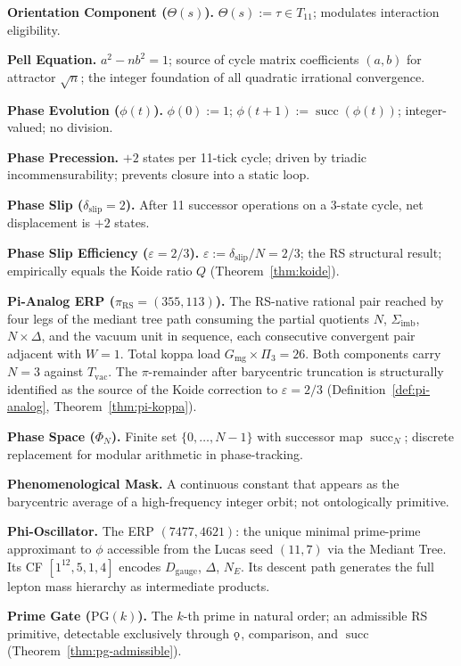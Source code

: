 \documentclass[11pt, letterpaper]{article}
\renewcommand{\succ}{\operatorname{succ}}
\newcommand{\koppa}{\mathbin{\text{\rm\k{o}}}}
\newcommand{\Tcyc}{T_{11}}
\newcommand{\Dg}{D_{\mathrm{gauge}}}
\newcommand{\Sigimb}{\Sigma_{\mathrm{imb}}}
\newcommand{\PG}{\mathrm{PG}}
\newcommand{\Gmg}{G_{\mathrm{mg}}}
\newcommand{\Tvac}{T_{\mathrm{vac}}}
\newcommand{\Pithree}{\Pi_3}
\newcommand{\piRS}{\pi_{\mathrm{RS}}}
\theoremstyle{definition}
\theoremstyle{plain}
\begin{document}
\medskip\noindent\textbf{Orientation Component ($\Theta(s)$).}
$\Theta(s):=\tau\in\Tcyc$; modulates interaction eligibility.

\medskip\noindent\textbf{Pell Equation.}
$a^2-nb^2=1$; source of cycle matrix coefficients $(a,b)$ for attractor
$\sqrt{n}$; the integer foundation of all quadratic irrational convergence.

\medskip\noindent\textbf{Phase Evolution ($\phi(t)$).}
$\phi(0):=1$; $\phi(t+1):=\succ(\phi(t))$; integer-valued; no division.

\medskip\noindent\textbf{Phase Precession.}
$+2$ states per 11-tick cycle; driven by triadic incommensurability;
prevents closure into a static loop.

\medskip\noindent\textbf{Phase Slip ($\delta_{\mathrm{slip}}=2$).}
After 11 successor operations on a 3-state cycle, net displacement is
$+2$ states.

\medskip\noindent\textbf{Phase Slip Efficiency ($\varepsilon=2/3$).}
$\varepsilon:=\delta_{\mathrm{slip}}/N=2/3$; the RS structural result;
empirically equals the Koide ratio $Q$ (Theorem~\ref{thm:koide}).

\medskip\noindent\textbf{Pi-Analog ERP ($\piRS=(355,113)$).}
The RS-native rational pair reached by four legs of the mediant tree path
consuming the partial quotients $N$, $\Sigimb$, $N\times\Delta$, and the
vacuum unit in sequence, each consecutive convergent pair adjacent with $W=1$.
Total koppa load $\Gmg\times\Pithree=26$.  Both components carry $N=3$
against $\Tvac$.  The $\pi$-remainder after barycentric truncation is
structurally identified as the source of the Koide correction to
$\varepsilon=2/3$ (Definition~\ref{def:pi-analog},
Theorem~\ref{thm:pi-koppa}).

\medskip\noindent\textbf{Phase Space ($\Phi_N$).}
Finite set $\{0,\dots,N-1\}$ with successor map $\succ_N$; discrete
replacement for modular arithmetic in phase-tracking.

\medskip\noindent\textbf{Phenomenological Mask.}
A continuous constant that appears as the barycentric average of a
high-frequency integer orbit; not ontologically primitive.

\medskip\noindent\textbf{Phi-Oscillator.}
The ERP $(7477,4621)$: the unique minimal prime-prime approximant to $\phi$
accessible from the Lucas seed $(11,7)$ via the Mediant Tree.  Its CF
$[1^{12},5,1,4]$ encodes $\Dg$, $\Delta$, $N_E$.  Its descent path generates
the full lepton mass hierarchy as intermediate products.

\medskip\noindent\textbf{Prime Gate ($\PG(k)$).}
The $k$-th prime in natural order; an admissible RS primitive, detectable
exclusively through $\koppa$, comparison, and $\succ$
(Theorem~\ref{thm:pg-admissible}).
\end{document}
